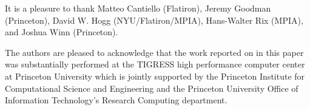 \documentclass[modern, letterpaper]{aastex62}
\newcommand{\apogee}{\project{\acronym{APOGEE}}}
\newcommand{\sdssiv}{\project{\acronym{SDSS-IV}}}
\begin{document}
It is a pleasure to thank
Matteo Cantiello (Flatiron),
Jeremy Goodman (Princeton),
David W. Hogg (NYU/Flatiron/MPIA),
Hans-Walter Rix (MPIA),
and Joshua Winn (Princeton).

The authors are pleased to acknowledge that the work reported on in this
paper was substantially performed at the TIGRESS high performance computer
center at Princeton University which is jointly supported by the Princeton
Institute for Computational Science and Engineering and the Princeton
University Office of Information Technology's Research Computing department.


\facility{\sdssiv, \apogee}

\clearpage



\end{document}
